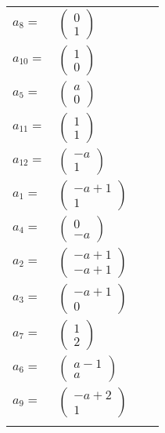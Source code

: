 \documentclass[1p]{elsarticle_modified}
\theoremstyle{definition}
\begin{document}
\begin{tabular}{m{7pt} m{180pt} m{7pt} m{180pt} }
\flushright $a_{8}=$&$\begin{pmatrix}0\\1\end{pmatrix}$ \\
\flushright $a_{10}=$&$\begin{pmatrix}1\\0\end{pmatrix}$ \\
\flushright $a_{5}=$&$\begin{pmatrix}a\\0\end{pmatrix}$ \\
\flushright $a_{11}=$&$\begin{pmatrix}1\\1\end{pmatrix}$ \\
\flushright $a_{12}=$&$\begin{pmatrix}- a\\1\end{pmatrix}$ \\
\flushright $a_{1}=$&$\begin{pmatrix}- a+1\\1\end{pmatrix}$ \\
\flushright $a_{4}=$&$\begin{pmatrix}0\\- a\end{pmatrix}$ \\
\flushright $a_{2}=$&$\begin{pmatrix}- a+1\\- a+1\end{pmatrix}$ \\
\flushright $a_{3}=$&$\begin{pmatrix}- a+1\\0\end{pmatrix}$ \\
\flushright $a_{7}=$&$\begin{pmatrix}1\\2\end{pmatrix}$ \\
\flushright $a_{6}=$&$\begin{pmatrix}a-1\\a\end{pmatrix}$ \\
\flushright $a_{9}=$&$\begin{pmatrix}- a+2\\1\end{pmatrix}$\\&\end{tabular}
\end{document}
